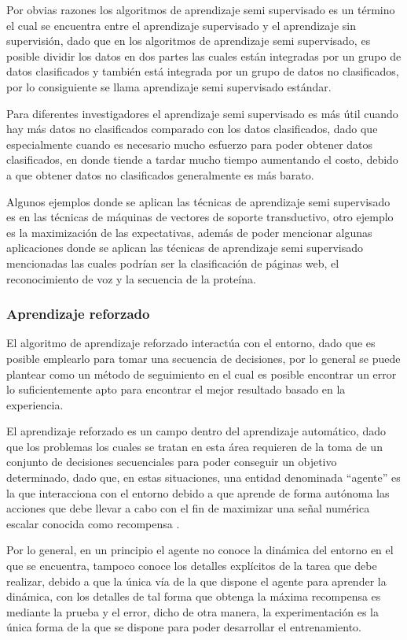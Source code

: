 Por obvias razones los algoritmos de aprendizaje semi supervisado es un término el cual se encuentra entre el aprendizaje supervisado y el aprendizaje sin supervisión, dado que en los algoritmos de aprendizaje semi supervisado, es posible dividir los datos en dos partes las cuales están integradas por un grupo de datos clasificados y también está integrada por un grupo de datos no clasificados, por lo consiguiente se llama aprendizaje semi supervisado estándar.

Para diferentes investigadores el aprendizaje semi supervisado es más útil cuando hay más datos no clasificados comparado con los datos clasificados, dado que especialmente cuando es necesario mucho esfuerzo para poder obtener datos clasificados, en donde tiende a tardar mucho tiempo aumentando el costo, debido a que obtener datos no clasificados generalmente es más barato.

Algunos ejemplos donde se aplican las técnicas de aprendizaje semi supervisado es en las técnicas de máquinas de vectores de soporte transductivo, otro ejemplo es la maximización de las expectativas, además de poder mencionar algunas aplicaciones donde se aplican las técnicas de aprendizaje semi supervisado mencionadas las cuales podrían ser la clasificación de páginas web, el reconocimiento de voz y la secuencia de la proteína.


\subsubsection{Aprendizaje reforzado}

El algoritmo de aprendizaje reforzado interactúa con el entorno, dado que es posible emplearlo para tomar una secuencia de decisiones, por lo general se puede plantear como un método de seguimiento en el cual es posible encontrar un error lo suficientemente apto para encontrar el mejor resultado basado en la experiencia.

El aprendizaje reforzado es un campo dentro del aprendizaje automático, dado que los problemas los cuales se tratan en esta área requieren de la toma de un conjunto de decisiones secuenciales para poder conseguir un objetivo determinado, dado que, en estas situaciones, una entidad denominada “agente” es la que interacciona con el entorno debido a que aprende de forma autónoma las acciones que debe llevar a cabo con el fin de maximizar una señal numérica escalar conocida como recompensa \cite{GuerraRamos2020}.

Por lo general, en un principio el agente no conoce la dinámica del entorno en el que se encuentra, tampoco conoce los detalles explícitos de la tarea que debe realizar, debido a que la única vía de la que dispone el agente para aprender la dinámica, con los detalles de tal forma que obtenga la máxima recompensa es mediante la prueba y el error, dicho de otra manera, la experimentación es la única forma de la que se dispone para poder desarrollar el entrenamiento.

